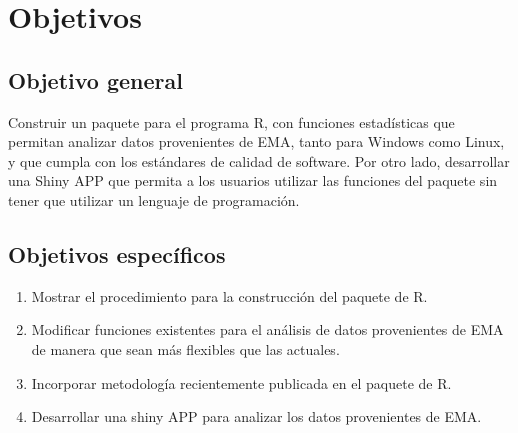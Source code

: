 \chapter{Objetivos}
\section{Objetivo general}

Construir un paquete para el programa R, con funciones estadísticas que permitan analizar datos provenientes de EMA, tanto para Windows como Linux, y que cumpla con los estándares de calidad de software. Por otro lado, desarrollar una Shiny APP que permita a los usuarios utilizar las funciones del paquete sin tener que utilizar un lenguaje de programación.


\section{Objetivos específicos}
\begin{enumerate}
\item Mostrar el procedimiento para la construcción del paquete de R.
\item Modificar funciones existentes para el análisis de datos provenientes de EMA de manera que sean más flexibles que las actuales.
\item Incorporar metodología recientemente publicada en el paquete de R.
\item Desarrollar una shiny APP para analizar los datos provenientes de EMA.
\end{enumerate}
